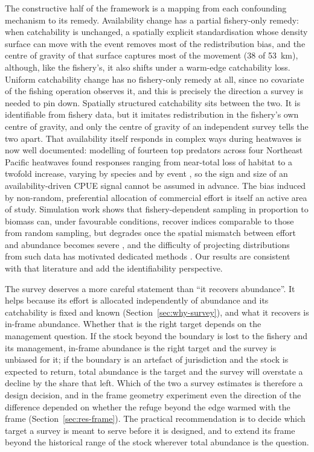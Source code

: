 \documentclass[11pt,a4paper]{article}
\begin{document}
The constructive half of the framework is a mapping from each confounding mechanism to its remedy. Availability change has a partial fishery-only remedy: when catchability is unchanged, a spatially explicit standardisation whose density surface can move with the event removes most of the redistribution bias, and the centre of gravity of that surface captures most of the movement (38 of 53~km), although, like the fishery's, it also shifts under a warm-edge catchability loss. Uniform catchability change has no fishery-only remedy at all, since no covariate of the fishing operation observes it, and this is precisely the direction a survey is needed to pin down. Spatially structured catchability sits between the two. It is identifiable from fishery data, but it imitates redistribution in the fishery's own centre of gravity, and only the centre of gravity of an independent survey tells the two apart. That availability itself responds in complex ways during heatwaves is now well documented: modelling of fourteen top predators across four Northeast Pacific heatwaves found responses ranging from near-total loss of habitat to a twofold increase, varying by species and by event \citep{welch2023}, so the sign and size of an availability-driven CPUE signal cannot be assumed in advance. The bias induced by non-random, preferential allocation of commercial effort is itself an active area of study. Simulation work shows that fishery-dependent sampling in proportion to biomass can, under favourable conditions, recover indices comparable to those from random sampling, but degrades once the spatial mismatch between effort and abundance becomes severe \citep{ducharme2022}, and the difficulty of projecting distributions from such data has motivated dedicated methods \citep{karp2023}. Our results are consistent with that literature and add the identifiability perspective.

The survey deserves a more careful statement than ``it recovers abundance''. It helps because its effort is allocated independently of abundance and its catchability is fixed and known (Section~\ref{sec:why-survey}), and what it recovers is in-frame abundance. Whether that is the right target depends on the management question. If the stock beyond the boundary is lost to the fishery and its management, in-frame abundance is the right target and the survey is unbiased for it; if the boundary is an artefact of jurisdiction and the stock is expected to return, total abundance is the target and the survey will overstate a decline by the share that left. Which of the two a survey estimates is therefore a design decision, and in the frame geometry experiment even the direction of the difference depended on whether the refuge beyond the edge warmed with the frame (Section~\ref{sec:res-frame}). The practical recommendation is to decide which target a survey is meant to serve before it is designed, and to extend its frame beyond the historical range of the stock wherever total abundance is the question.
\end{document}
